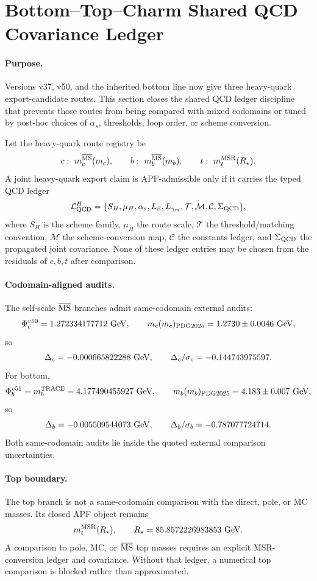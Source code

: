
\section{Bottom--Top--Charm Shared QCD Covariance Ledger}
\label{sec:heavy-qcd-ledger-v51}

\paragraph{Purpose.}
Versions v37, v50, and the inherited bottom line now give three heavy-quark
export-candidate routes.  This section closes the shared QCD ledger discipline
that prevents those routes from being compared with mixed codomains or tuned by
post-hoc choices of $\alpha_s$, thresholds, loop order, or scheme conversion.

\begin{theorem}
Let the heavy-quark route registry be
\[
 c:\ m_c^{\overline{\rm MS}}(m_c),\qquad
 b:\ m_b^{\overline{\rm MS}}(m_b),\qquad
 t:\ m_t^{\rm MSR}(R_\star).
\]
A joint heavy-quark export claim is APF-admissible only if it carries the typed
QCD ledger
\[
\mathcal L_{\rm QCD}^H=
\{S_H,\mu_H,\alpha_s, L_\beta,L_{\gamma_m},\mathcal T,\mathcal M,
\mathcal C,\Sigma_{\rm QCD}\},
\]
where $S_H$ is the scheme family, $\mu_H$ the route scale, $\mathcal T$ the
threshold/matching convention, $\mathcal M$ the scheme-conversion map,
$\mathcal C$ the constants ledger, and $\Sigma_{\rm QCD}$ the propagated joint
covariance.  None of these ledger entries may be chosen from the residuals of
$c,b,t$ after comparison.
\end{theorem}

\paragraph{Codomain-aligned audits.}
The self-scale $\overline{\rm MS}$ branches admit same-codomain external audits:
\[
\Phi_c^{v50}=1.272334177712\ {\rm GeV},\qquad
m_c(m_c)_{\rm PDG2025}=1.2730\pm0.0046\ {\rm GeV},
\]
so
\[
\Delta_c=-0.000665822288\ {\rm GeV},
\qquad \Delta_c/\sigma_c=-0.144743975597.
\]
For bottom,
\[
\Phi_b^{v51}=m_b^{\rm TRACE}=4.177490455927\ {\rm GeV},\qquad
m_b(m_b)_{\rm PDG2025}=4.183\pm0.007\ {\rm GeV},
\]
so
\[
\Delta_b=-0.005509544073\ {\rm GeV},
\qquad \Delta_b/\sigma_b=-0.787077724714.
\]
Both same-codomain audits lie inside the quoted external comparison
uncertainties.

\paragraph{Top boundary.}
The top branch is not a same-codomain comparison with the direct, pole, or MC
masses.  Its closed APF object remains
\[
 m_t^{\rm MSR}(R_\star),\qquad R_\star=85.8572226983853\ {\rm GeV}.
\]
A comparison to pole, MC, or $\overline{\rm MS}$ top masses requires an explicit
MSR-conversion ledger and covariance.  Without that ledger, a numerical top
comparison is blocked rather than approximated.

